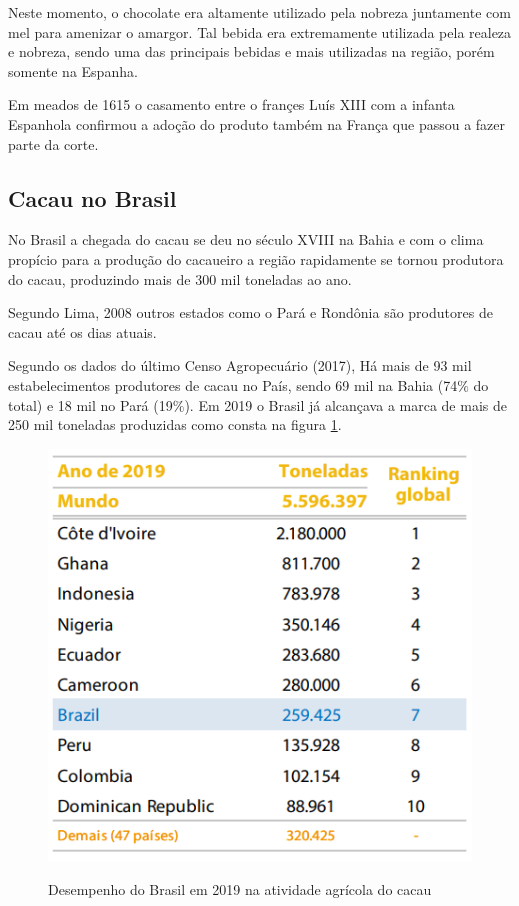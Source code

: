\documentclass[
	12pt,				%
	openright,			%
	oneside,			%
	a4paper,			%
	english,			%
	french,				%
	spanish,			%
	brazil				%
	]{abntex2}
\begin{document}
Neste momento, o chocolate era altamente utilizado pela nobreza juntamente com mel para amenizar o amargor. Tal bebida era extremamente utilizada pela realeza e nobreza, sendo uma das principais bebidas e mais utilizadas na região, porém somente na Espanha.

Em meados de 1615 o casamento entre o françes Luís XIII com a infanta Espanhola confirmou a adoção do produto também na França que passou a fazer parte da corte.

\subsection{Cacau no Brasil}

No Brasil a chegada do cacau se deu no século XVIII na Bahia e com o clima propício para a produção do cacaueiro a região rapidamente se tornou produtora do cacau, produzindo mais de 300 mil toneladas ao ano. \cite{1} \cite{7}

Segundo Lima, 2008 outros estados como o Pará e Rondônia são produtores de cacau até os dias atuais.

Segundo os dados do último Censo Agropecuário (2017), Há mais de 93 mil estabelecimentos produtores de cacau no País, sendo 69 mil na Bahia (74$\%$ do total) e 18 mil no Pará (19$\%$). Em 2019 o Brasil já alcançava a marca de mais de 250 mil toneladas produzidas como consta na figura \ref{fig2}. \cite{7}

\begin{figure}[H]
\begin{center}
\caption{Desempenho do Brasil em 2019 na atividade agrícola do cacau}
\includegraphics[scale=0.8]{../../Pictures/tabela.png} 
\label{fig2}
\end{center}
\end{figure}
\end{document}
